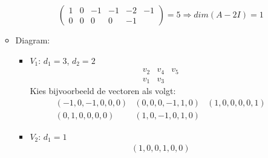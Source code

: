\documentclass[main.tex]{subfiles}
\begin{document}
\begin{itemize}
\begin{itemize}
\begin{itemize}
\[\begin{pmatrix}
         1 & 0 & -1 & -1 & -2 & -1\\
         0 & 0 & 0 & 0 & -1
       \end{pmatrix}
       =5 \Rightarrow dim(A-2I) = 1
       \]
     \end{itemize}
   \item Diagram:
     \begin{itemize}
     \item $V_{1}$: $d_{1} = 3$, $d_{2} = 2$
       \[
       \begin{array}{ccc}
         \boxed{v_{2}} & \boxed{v_{4}} & \boxed{v_{5}}\\
         \boxed{v_{1}} & \boxed{v_{3}}
       \end{array}
       \]
       Kies bijvoorbeeld de vectoren als volgt:
       \[
       \begin{array}{ccc}
         \boxed{(-1,0,-1,0,0,0)} & \boxed{(0,0,0,-1,1,0)} & \boxed{(1,0,0,0,0,1)}\\
         \boxed{(0,1,0,0,0,0)} & \boxed{(1,0,-1,0,1,0)}
       \end{array}
       \]
     \item $V_{2}$: $d_{1}=1$
       \[
       \begin{array}{ccc}
         \boxed{(1,0,0,1,0,0)}
       \end{array}
       \]


\end{itemize}
\end{itemize}
\end{itemize}
\end{document}
